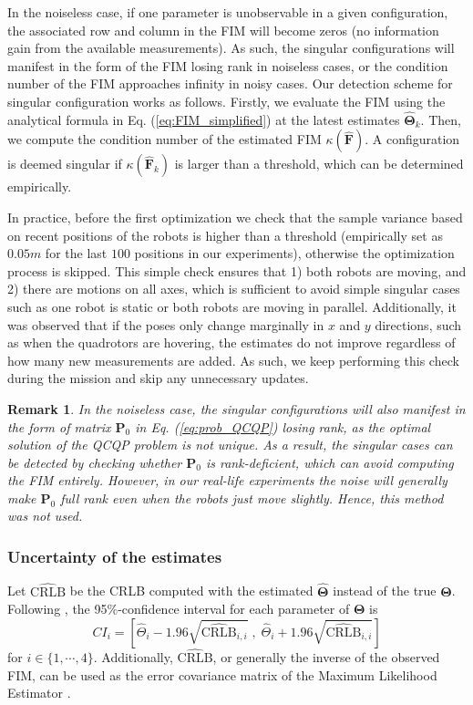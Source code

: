 \documentclass[journal]{IEEEtran}
\newtheorem{rem}{Remark}[section]
\def\StateVector{\mathbf{\Theta}}
\def\FIM{\mathbf{F}}
\def\condF{\kappa(\hat{\FIM})}
\begin{document}
In the noiseless case, if one parameter is unobservable in a given configuration, the associated row and column in the FIM will become zeros (no information gain from the available measurements). As such, the singular configurations will manifest in the form of the FIM losing rank in noiseless cases, or the condition number of the FIM approaches infinity in noisy cases. Our detection scheme for singular configuration works as follows. Firstly, we evaluate the FIM using the analytical formula in Eq. (\ref{eq:FIM_simplified}) at the latest estimates $\hat{\StateVector}_k$. Then, we compute the condition number of the estimated FIM $\condF$. A configuration is deemed singular if $\kappa(\hat{\FIM}_k)$ is larger than a threshold, which can be determined empirically.%

In practice, before the first optimization we check that the sample variance based on recent positions of the robots is higher than a threshold (empirically set as $0.05\si{m}$ for the last $100$ positions in our experiments), otherwise the optimization process is skipped. This simple check ensures that 1) both robots are moving, and 2) there are motions on all axes, which is sufficient to avoid simple singular cases such as one robot is static or both robots are moving in parallel. Additionally, it was observed that if the poses only change marginally in $x$ and $y$ directions, such as when the quadrotors are hovering, the estimates do not improve regardless of how many new measurements are added. As such, we keep performing this check during the mission and skip any unnecessary updates.

\begin{rem}
In the noiseless case, the singular configurations will also manifest in the form of matrix $\mathbf{P}_0$ in Eq. (\ref{eq:prob_QCQP}) losing rank, as the optimal solution of the QCQP problem is not unique. As a result, the singular cases can be detected by checking whether $\mathbf{P}_0$ is rank-deficient, which can avoid computing the FIM entirely. However, in our real-life experiments the noise will generally make $\mathbf{P}_0$ full rank even when the robots just move slightly. Hence, this method was not used.
\end{rem}

\subsubsection{Uncertainty of the estimates}
Let $\hat{\textrm{CRLB}}$ be the CRLB computed with the estimated $\hat{\StateVector}$ instead of the true $\StateVector$. Following \cite{ly2017FIMtutorial}, the 95\%-confidence interval for each parameter of $\StateVector$ is
\begin{equation}
    CI_i = \left[ 
        \hat{\Theta}_i - 1.96 \sqrt{\hat{\textrm{CRLB}}_{i,i}} \;, \;
        \hat{\Theta}_i + 1.96 \sqrt{\hat{\textrm{CRLB}}_{i,i}}
    \right]
\end{equation}
for $i \in \{1,\cdots,4\}$. Additionally, $\hat{\textrm{CRLB}}$, or generally the inverse of the observed FIM, can be used as the error covariance matrix of the Maximum Likelihood Estimator \cite{ponda2009trajopt}.
\end{document}
